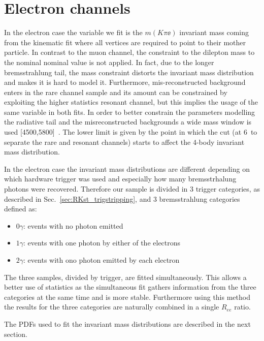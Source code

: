 \section{Electron channels}
\label{sec:RKst_fit_ee}

In the electron case the variable we fit is the $m(K\pi\ee)$ invariant mass coming from the kinematic
fit where all vertices are required to point to their mother particle. 
In contrast to the muon channel,
the constraint to the dilepton mass to the nominal \jpsi nominal value is not applied.
In fact, due to the longer bremsstrahlung tail, the \jpsi mass constraint distorts the invariant mass distribution
and makes it is hard to model it. Furthermore, mis-reconstructed background enters in the rare channel sample and
its amount can be constrained by exploiting the higher statistics resonant channel, but this implies
the usage of the same variable in both fits.
In order to better constrain the parameters modelling the radiative tail and the misreconstructed
backgrounds a wide mass window is used [4500,5800]~\mevcc. The lower limit is given
by the point in which the \qsq cut (at 6~\gevgevcccc to separate the rare and resonant channels)
starts to affect the 4-body invariant mass distribution.

In the electron case the invariant mass distributions are different depending on which hardware
trigger was used and especially how many bremsstrhalung photons were recovered.
Therefore our sample is divided in 3 trigger categories, as described in
Sec.~\ref{sec:RKst_trigstripping}, and 3 bremsstrahlung categories defined as:
%
\begin{itemize}
\item $0\gamma$: events with no photon emitted
\item $1\gamma$: events with one photon by either of the electrons
\item $2\gamma$: events with ono photon emitted by each electron
\end{itemize}
%
The three samples, divided by trigger, are fitted simultaneously.
This allows a better use of statistics as the simultaneous fit
gathers information from the three categories at the same time and is more stable.
Furthermore using this method the results for the three categories are
naturally combined in a single $R_{ee}$ ratio.

The PDFs used to fit the invariant mass distributions are described in the next section.



